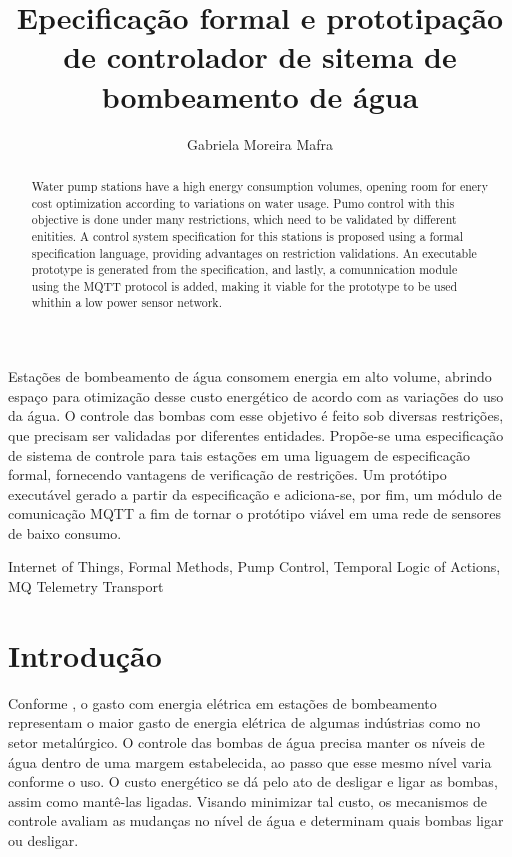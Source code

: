 \documentclass[12pt]{article}
\title{Epecificação formal e prototipação de controlador de sitema de
  bombeamento de água}
\author{Gabriela Moreira Mafra\inst{1}}
\begin{document}
\maketitle

\begin{resumo}
 Estações de bombeamento de água consomem energia em alto volume, abrindo espaço
 para otimização desse custo energético de acordo com as variações do uso da
 água. O controle das bombas com esse objetivo é feito sob diversas restrições,
 que precisam ser validadas por diferentes entidades. Propõe-se uma
 especificação de sistema de controle para tais estações em uma liguagem de
 especificação formal, fornecendo vantagens de verificação de restrições. Um
 protótipo executável gerado a partir da especificação e adiciona-se, por
 fim, um módulo de comunicação MQTT a fim de tornar o protótipo viável em uma
 rede de sensores de baixo consumo. 
\end{resumo}

\begin{abstract}
 Water pump stations have a high energy consumption volumes, opening room for
 enery cost optimization according to variations on water usage. Pumo control
 with this objective is done under many restrictions, which need to be validated
 by different enitities. A control system specification for this stations is
 proposed using a formal specification language, providing advantages on
 restriction validations. An executable prototype is generated from the
 specification, and lastly, a comunnication module using the MQTT protocol is
 added, making it viable for the prototype to be used whithin a low power
 sensor network.
\end{abstract}

\begin{keyword}
  Internet of Things, Formal Methods, Pump Control, Temporal Logic of Actions, MQ Telemetry Transport
\end{keyword}
  
\section{Introdução}

Conforme \cite{feng}, o gasto com energia elétrica em estações de bombeamento
representam o maior gasto de energia elétrica de algumas indústrias como no
setor metalúrgico. O controle das bombas de água precisa manter os níveis de
água dentro de uma margem estabelecida, ao passo que esse mesmo nível varia
conforme o uso. O custo energético se dá pelo ato de desligar e ligar as
bombas, assim como mantê-las ligadas. Visando minimizar tal custo, os mecanismos
de controle avaliam as mudanças no nível de água e determinam quais bombas ligar
ou desligar.
\end{document}
